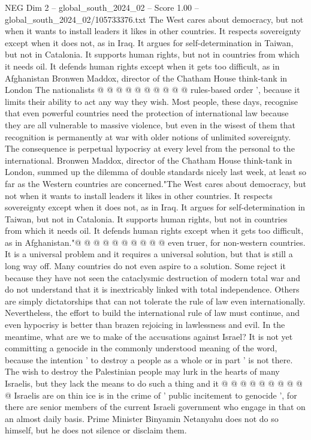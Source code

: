 \begin{textsample}{NEG Dim 2 – global\_south\_2024\_02 – Score 1.00 – global\_south\_2024\_02/105733376.txt}
The West cares about democracy, but not when it wants to install leaders it likes in other countries.
It respects sovereignty except when it does not, as in Iraq.
It argues for self-determination in Taiwan, but not in Catalonia.
It supports human rights, but not in countries from which it needs oil.
It defends human rights except when it gets too difficult, as in Afghanistan Bronwen Maddox, director of the Chatham House think-tank in London The nationalists @ @ @ @ @ @ @ @ @ @ rules-based order ', because it limits their ability to act any way they wish.
Most people, these days, recognise that even powerful countries need the protection of international law because they are all vulnerable to massive violence, but even in the wisest of them that recognition is permanently at war with older notions of unlimited sovereignty.
The consequence is perpetual hypocrisy at every level from the personal to the international.
Bronwen Maddox, director of the Chatham House think-tank in London, summed up the dilemma of double standards nicely last week, at least so far as the Western countries are concerned."The West cares about democracy, but not when it wants to install leaders it likes in other countries.
It respects sovereignty except when it does not, as in Iraq.
It argues for self-determination in Taiwan, but not in Catalonia.
It supports human rights, but not in countries from which it needs oil.
It defends human rights except when it gets too difficult, as in Afghanistan."@ @ @ @ @ @ @ @ @ @ even truer, for non-western countries.
It is a universal problem and it requires a universal solution, but that is still a long way off.
Many countries do not even aspire to a solution.
Some reject it because they have not seen the cataclysmic destruction of modern total war and do not understand that it is inextricably linked with total independence.
Others are simply dictatorships that can not tolerate the rule of law even internationally.
Nevertheless, the effort to build the international rule of law must continue, and even hypocrisy is better than brazen rejoicing in lawlessness and evil.
In the meantime, what are we to make of the accusations against Israel?
It is not yet committing a genocide in the commonly understood meaning of the word, because the intention ' to destroy a people as a whole or in part ' is not there.
The wish to destroy the Palestinian people may lurk in the hearts of many Israelis, but they lack the means to do such a thing and it @ @ @ @ @ @ @ @ @ @ Israelis are on thin ice is in the crime of ' public incitement to genocide ', for there are senior members of the current Israeli government who engage in that on an almost daily basis.
Prime Minister Binyamin Netanyahu does not do so himself, but he does not silence or disclaim them.

\end{textsample}
